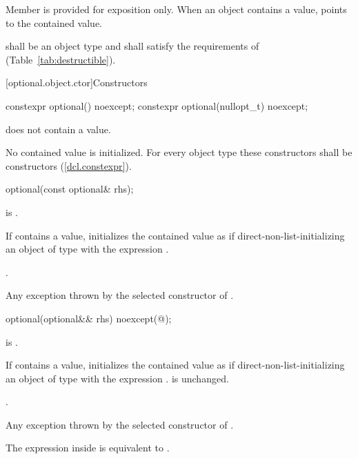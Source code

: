 \pnum
Member  is provided for exposition only. When an  object contains a value,  points to the contained value.

\pnum
{} shall be an object type and shall satisfy the requirements of  (Table~\ref{tab:destructible}).

[optional.object.ctor]{Constructors}

%
\begin{itemdecl}
constexpr optional() noexcept;
constexpr optional(nullopt_t) noexcept;
\end{itemdecl}

\begin{itemdescr}
\pnum
\postcondition
{} does not contain a value.

\pnum
\remarks
No contained value is initialized.
For every object type  these constructors shall be  constructors (\ref{dcl.constexpr}).
\end{itemdescr}

%
\begin{itemdecl}
optional(const optional& rhs);
\end{itemdecl}

\begin{itemdescr}
\pnum
\requires
{} is .

\pnum
\effects
If  contains a value, initializes the contained value as if
direct-non-list-initializing an object of type  with the expression .

\pnum
\postcondition
{}.

\pnum
\throws
Any exception thrown by the selected constructor of .
\end{itemdescr}

%
\begin{itemdecl}
optional(optional&& rhs) noexcept(@\seebelow@);
\end{itemdecl}

\begin{itemdescr}
\pnum
\requires
{} is .

\pnum
\effects
If  contains a value, initializes the contained value as if
direct-non-list-initializing an object of type  with the expression .
 is unchanged.

\pnum
\postcondition
{}.

\pnum
\throws
Any exception thrown by the selected constructor of .

\pnum
\remarks
The expression inside  is equivalent to
.
\end{itemdescr}

